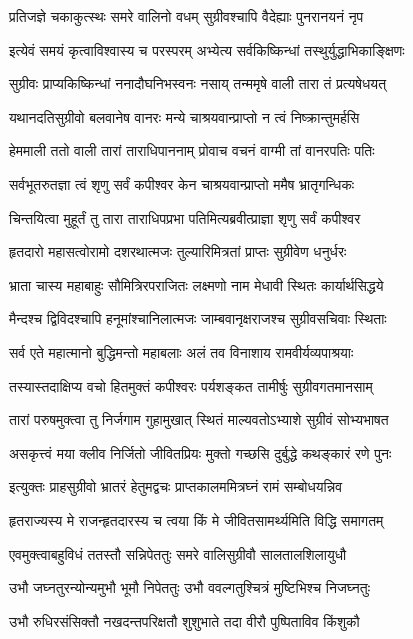 \twolineshloka
{प्रतिजज्ञे चकाकुत्स्थः समरे वालिनो वधम्}
{सुग्रीवश्चापि वैदेह्याः पुनरानयनं नृप}


\twolineshloka
{इत्येवं समयं कृत्वाविश्वास्य च परस्परम्}
{अभ्येत्य सर्वकिष्किन्धां तस्थुर्युद्धाभिकाङ्क्षिणः}


\twolineshloka
{सुग्रीवः प्राप्यकिष्किन्धां ननादौघनिभस्वनः}
{नसाय् तन्ममृषे वाली तारा तं प्रत्यषेधयत्}


\twolineshloka
{यथानदतिसुग्रीवो बलवानेष वानरः}
{मन्ये चाश्रयवान्प्राप्तो न त्वं निष्क्रान्तुमर्हसि}


\twolineshloka
{हेममाली ततो वाली तारां ताराधिपाननाम्}
{प्रोवाच वचनं वाग्मी तां वानरपतिः पतिः}


\twolineshloka
{सर्वभूतरुतज्ञा त्वं शृणु सर्वं कपीश्वर}
{केन चाश्रयवान्प्राप्तो ममैष भ्रातृगन्धिकः}

\twolineshloka
{चिन्तयित्वा मुहूर्तं तु तारा ताराधिपप्रभा}
{पतिमित्यब्रवीत्प्राज्ञा शृणु सर्वं कपीश्वर}


\twolineshloka
{हृतदारो महासत्वोरामो दशरथात्मजः}
{तुल्यारिमित्रतां प्राप्तः सुग्रीवेण धनुर्धरः}


\twolineshloka
{भ्राता चास्य महाबाहुः सौमित्रिरपराजितः}
{लक्ष्मणो नाम मेधावी स्थितः कार्यार्थसिद्धये}


\twolineshloka
{मैन्दश्च द्विविदश्चापि हनूमांश्चानिलात्मजः}
{जाम्बवानृक्षराजश्च सुग्रीवसचिवाः स्थिताः}


\twolineshloka
{सर्व एते महात्मानो बुद्धिमन्तो महाबलाः}
{अलं तव विनाशाय रामवीर्यव्यपाश्रयाः}


\twolineshloka
{तस्यास्तदाक्षिप्य वचो हितमुक्तं कपीश्वरः}
{पर्यशङ्कत तामीर्षुः सुग्रीवगतमानसाम्}


\twolineshloka
{तारां परुषमुक्त्वा तु निर्जगाम गुहामुखात्}
{स्थितं माल्यवतोऽभ्याशे सुग्रीवं सोभ्यभाषत}


\twolineshloka
{असकृत्त्वं मया क्लीव निर्जितो जीवितप्रियः}
{मुक्तो गच्छसि दुर्बुद्धे कथङ्कारं रणे पुनः}


\twolineshloka
{इत्युक्तः प्राहसुग्रीवो भ्रातरं हेतुमद्वचः}
{प्राप्तकालममित्रघ्नं रामं सम्बोधयन्निव}


\twolineshloka
{हृतराज्यस्य मे राजन्हृतदारस्य च त्वया}
{किं मे जीवितसामर्थ्यमिति विद्धि समागतम्}


\twolineshloka
{एवमुक्त्वाबहुविधं ततस्तौ सन्निपेततुः}
{समरे वालिसुग्रीवौ सालतालशिलायुधौ}


\twolineshloka
{उभौ जघ्नतुरन्योन्यमुभौ भूमौ निपेततुः}
{उभौ ववल्गतुश्चित्रं मुष्टिभिश्च निजघ्नतुः}


\twolineshloka
{उभौ रुधिरसंसिक्तौ नखदन्तपरिक्षतौ}
{शुशुभाते तदा वीरौ पुष्पिताविव किंशुकौ}


